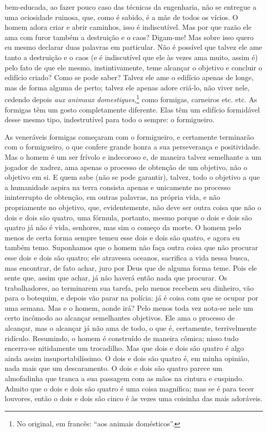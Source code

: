 bem-educada, ao fazer pouco caso das técnicas da engenharia, não se entregue a
uma ociosidade ruinosa, que, como é sabido, é a mãe de todos os vícios. O homem
adora criar e abrir caminhos, isso é indiscutível. Mas por que razão ele ama
com furor também a destruição e o caos? Digam-me! Mas sobre isso quero eu mesmo
declarar duas palavras em particular. Não é possível que talvez ele ame tanto a
destruição e o caos (e é indiscutível que ele às vezes ama muito, assim é) pelo
fato de que ele mesmo, instintivamente, teme alcançar o objetivo e concluir o
edifício criado? Como se pode saber? Talvez ele ame o edifício apenas de longe,
mas de forma alguma de perto; talvez ele apenas adore criá-lo, não viver nele,
cedendo depois \textit{aux animaux domestiques},\footnote{ No original, em
francês: “aos animais domésticos”.} como formigas, carneiros etc. etc. As
formigas têm um gosto completamente diferente. Elas têm um edifício formidável
desse mesmo tipo, indestrutível para todo o sempre: o formigueiro.

As veneráveis formigas começaram com o formigueiro, e certamente
terminarão com o formigueiro, o que confere grande honra a sua
perseverança e positividade. Mas o homem é um ser frívolo e indecoroso
e, de maneira talvez semelhante a um jogador de xadrez, ama apenas o
processo de obtenção de um objetivo, não o objetivo em si. E quem sabe
(não se pode garantir), talvez, todo o objetivo a que a humanidade
aspira na terra consista apenas e unicamente no processo ininterrupto
de obtenção, em outras palavras, na própria vida, e não propriamente no
objetivo, que, evidentemente, não deve ser outra coisa que não o dois e
dois são quatro, uma fórmula, portanto, mesmo porque o dois e dois são
quatro já não é vida, senhores, mas sim o começo da morte. O homem pelo
menos de certa forma sempre temeu esse dois e dois são quatro, e agora
eu também temo. Suponhamos que o homem não faça outra coisa que não
procurar esse dois e dois são quatro; ele atravessa oceanos, sacrifica
a vida nessa busca, mas encontrar, de fato achar, juro por Deus que de
alguma forma teme. Pois ele sente que, assim que achar, já não haverá
então nada que procurar. Os trabalhadores, ao terminarem sua tarefa,
pelo menos recebem seu dinheiro, vão para o botequim, e depois vão
parar na polícia: já é coisa com que se ocupar por uma semana. Mas e o
homem, aonde irá? Pelo menos toda vez nota-se nele um certo incômodo ao
alcançar semelhantes objetivos. Ele ama o processo de alcançar, mas o
alcançar já não ama de todo, o que é, certamente, terrivelmente
ridículo. Resumindo, o homem é construído de maneira cômica; nisso tudo
encerra-se nitidamente um trocadilho. Mas que dois e dois são quatro é
algo ainda assim insuportabilíssimo. O dois e dois são quatro é, em
minha opinião, nada mais que um descaramento. O dois e dois são quatro
parece um almofadinha que tranca a sua passagem com as mãos na cintura
e cuspindo. Admito que o dois e dois são quatro é uma coisa magnífica;
mas se é para tecer louvores, então o dois e dois são cinco é às vezes
uma coisinha das mais adoráveis.


